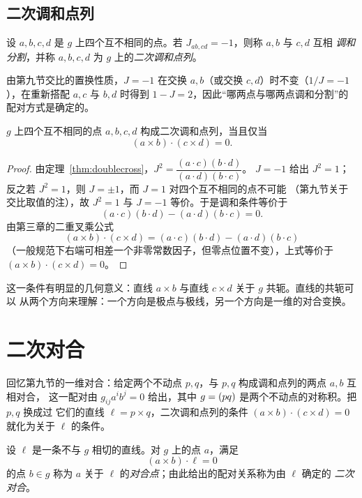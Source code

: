 \subsection{二次调和点列}

\begin{definition}[二次调和点列]
设 $a,b,c,d$ 是 $g$ 上四个互不相同的点。若 $J_{ab,cd}=-1$，则称 $a,b$ 与 $c,d$ 互相
\emph{调和分割}，并称 $a,b,c,d$ 为 $g$ 上的\emph{二次调和点列}。
\end{definition}

由第九节交比的置换性质，$J=-1$ 在交换 $a,b$（或交换 $c,d$）时不变（$1/J=-1$），在重新搭配
$a,c$ 与 $b,d$ 时得到 $1-J=2$，因此“哪两点与哪两点调和分割”的配对方式是确定的。

\begin{proposition}[二次调和点列的代数条件]\label{prop:doubleharmonic}
$g$ 上四个互不相同的点 $a,b,c,d$ 构成二次调和点列，当且仅当
\[
(a\times b)\cdot(c\times d)=0 .
\]
\end{proposition}

\begin{proof}
由定理~\ref{thm:doublecross}，$J^2=\dfrac{(a\cdot c)(b\cdot d)}{(a\cdot d)(b\cdot c)}$。
$J=-1$ 给出 $J^2=1$；反之若 $J^2=1$，则 $J=\pm1$，而 $J=1$ 对四个互不相同的点不可能
（第九节关于交比取值的注），故 $J^2=1$ 与 $J=-1$ 等价。于是调和条件等价于
\[
(a\cdot c)(b\cdot d)-(a\cdot d)(b\cdot c)=0 .
\]
由第三章的二重叉乘公式
\[
(a\times b)\cdot(c\times d)=(a\cdot c)(b\cdot d)-(a\cdot d)(b\cdot c)
\]
（一般规范下右端可相差一个非零常数因子，但零点位置不变），上式等价于
$(a\times b)\cdot(c\times d)=0$。
\end{proof}

这一条件有明显的几何意义：直线 $a\times b$ 与直线 $c\times d$ 关于 $g$ 共轭。直线的共轭可以
从两个方向来理解：一个方向是极点与极线，另一个方向是一维的对合变换。

\section{二次对合}

回忆第九节的一维对合：给定两个不动点 $p,q$，与 $p,q$ 构成调和点列的两点 $a,b$ 互相对合，
这一配对由 $g_{ij}a^ib^j=0$ 给出，其中 $g=(pq)$ 是两个不动点的对称积。把 $p,q$ 换成过
它们的直线 $\ell=p\times q$，二次调和点列的条件 $(a\times b)\cdot(c\times d)=0$ 就化为关于
$\ell$ 的条件。

\begin{definition}[二次对合]\label{def:doubleinv}
设 $\ell$ 是一条不与 $g$ 相切的直线。对 $g$ 上的点 $a$，满足
\[
(a\times b)\cdot\ell=0
\]
的点 $b\in g$ 称为 $a$ 关于 $\ell$ 的\emph{对合点}；由此给出的配对关系称为由 $\ell$ 确定的
\emph{二次对合}。
\end{definition}

